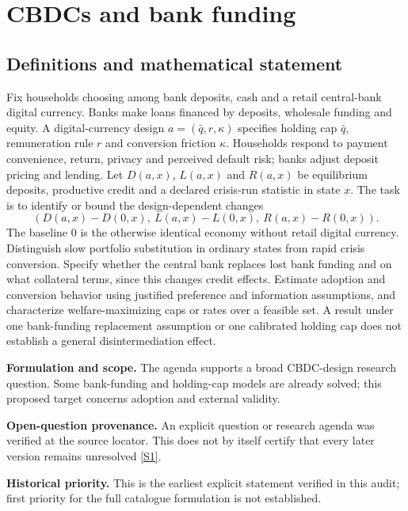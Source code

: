 \documentclass[11pt]{article}
\newcommand{\sref}[2]{\hyperlink{source:#1:#2}{[S#2]}}
\begin{document}
\section*{CBDCs and bank funding}\label{30007611}
\subsection{Definitions and mathematical statement}
Fix households choosing among bank deposits, cash and a retail central-bank digital currency. Banks make loans financed by deposits, wholesale funding and equity. A digital-currency design \(a=(\bar q,r,\kappa)\) specifies holding cap \(\bar q\), remuneration rule \(r\) and conversion friction \(\kappa\). Households respond to payment convenience, return, privacy and perceived default risk; banks adjust deposit pricing and lending. Let \(D(a,x)\), \(L(a,x)\) and \(R(a,x)\) be equilibrium deposits, productive credit and a declared crisis-run statistic in state \(x\). The task is to identify or bound the design-dependent changes
\[(D(a,x)-D(0,x),\ L(a,x)-L(0,x),\ R(a,x)-R(0,x)).\]
The baseline \(0\) is the otherwise identical economy without retail digital currency. Distinguish slow portfolio substitution in ordinary states from rapid crisis conversion. Specify whether the central bank replaces lost bank funding and on what collateral terms, since this changes credit effects. Estimate adoption and conversion behavior using justified preference and information assumptions, and characterize welfare-maximizing caps or rates over a feasible set. A result under one bank-funding replacement assumption or one calibrated holding cap does not establish a general disintermediation effect.

\par\textbf{Formulation and scope.} The agenda supports a broad CBDC-design research question. Some bank-funding and holding-cap models are already solved; this proposed target concerns adoption and external validity.

\par\textbf{Open-question provenance.} An explicit question or research agenda was verified at the source locator. This does not by itself certify that every later version remains unresolved \sref{30007611}{1}.

\par\textbf{Historical priority.} This is the earliest explicit statement verified in this audit; first priority for the full catalogue formulation is not established.
\end{document}
